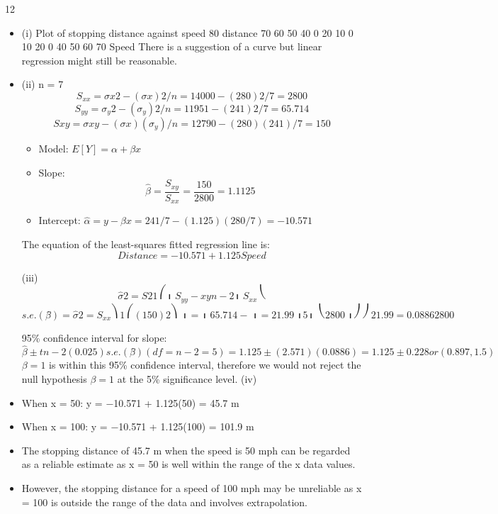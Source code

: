 \documentclass[a4paper,12pt]{article}
\begin{document}
12
\begin{itemize}
\item (i)
Plot of stopping distance against speed
80
distance
70
60
50
40
0
20
10
0
10
20
0
40
50
60
70
Speed
There is a suggestion of a curve but linear regression might still be reasonable.
\item (ii)
n = 7
\[S_{xx} = \sigma x 2 − (\sigma x) 2 /n = 14000 − (280) 2 /7 = 2800\]
\[S_{yy} = \sigma_y 2 − (\sigma_y) 2 /n = 11951 − (241) 2 /7 = 65.714\]
\[S xy = \sigma xy − (\sigma x)( \sigma_y)/n = 12790 − (280)(241)/7 = 150\]
\begin{itemize}
    \item 

Model: $E[Y] = \alpha + \beta x$
\item Slope: \[\hat{\beta} =
\frac{S_{xy}}{S_{xx}} = \frac{150}{2800} = 1.1125\]

\item Intercept: $\hat{\alpha} = y − \hat{\beta} x = 241/7 − (1.125)(280/7) = −10.571$
\end{itemize}
The equation of the least-squares fitted regression line is:
\[Distance = −10.571 + 1.125 Speed\]


(iii)
\[\hat{\sigma} 2 =
S 2
1 ⎛
⎜ S_{yy} − xy
n − 2 ⎜
S_{xx}
⎝\]
\[s.e.( \betâ ) =
\hat{\sigma} 2
=
S_{xx}
⎞ 1 ⎛
(150) 2 ⎞
⎟ = ⎜ 65.714 −
⎟ = 21.99
⎟ 5 ⎜ ⎝
2800 ⎟ ⎠
⎠
21.99
= 0.0886
2800\]

95\% confidence interval for slope:
\[\hat{\beta} \pm t n − 2 (0.025) s.e.( \betâ )
(df = n − 2 = 5)
= 1.125 \pm (2.571)(0.0886) = 1.125 \pm 0.228 or (0.897, 1.5)\]
$\beta = 1$ is within this 95\% confidence interval, therefore we would not reject the
null hypothesis $\beta = 1$ at the 5\% significance level.
(iv)
\item When x = 50: y = −10.571 + 1.125(50) = 45.7 m
\item When x = 100: y = −10.571 + 1.125(100) = 101.9 m
\item The stopping distance of 45.7 m when the speed is 50 mph can be regarded as a reliable estimate as x = 50 is well within the range of the x data values.
\item However, the stopping distance for a speed of 100 mph may be unreliable as
x = 100 is outside the range of the data and involves extrapolation.
\end{itemize}
\end{document}
